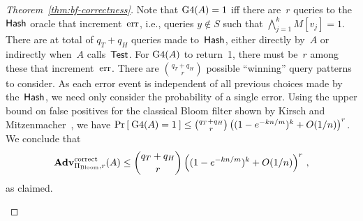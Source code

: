 \begin{proof}[Theorem~\ref{thm:bf-correctness}]
Note that $\text{G4}(A)=1$ iff there are~$r$ queries to the
$\mathsf{Hash}$ oracle that increment~$\mathrm{err}$, i.e., queries $y \not\in
S$ such that $\bigwedge_{j=1}^{k} M[v_j]=1$.
There are at total of $q_T + q_H$ queries made to~$\mathsf{Hash}$,
either directly by~$A$ or indirectly when~$A$ calls~$\mathsf{Test}$.
For $\game{4}(A)$ to return~1, there must be~$r$ among these that
increment~$\mathrm{err}$. %
There are $\binom{q_T+q_H}{r}$ possible ``winning'' query patterns
to consider.   As each error event is independent of all previous
choices made by the~$\mathsf{Hash}$, we need only consider the
probability of a single error. Using the upper bound on false
positives for the classical Bloom filter shown by Kirsch and
Mitzenmacher~\cite{kirsch2006less}, we have $\Pr\left[\: \text{G4}(A)=1 \:\right]
\leq \binom{q_T+q_H}{r}\left( (1-e^{-kn/m})^k + O(1/n) \right)^r$.
We conclude that
\[
\mathrm{\mathbf{Adv}}^{\mathrm{correct}}_{\Pi_{\mathrm{Bloom}},r}(A) \leq  {\dbinom{q_T + q_H}{r}} \left( (1-e^{-kn/m})^k + O(1/n) \right)^r\,,
\]
as claimed.
\begin{figure}[tp]
\fpage{.8}{
\hpagessl{.4}{.4}
{
\underline{$\game{4}(A)$} \\ %
$S \getsr A$; $\err \gets 0$;  $\calC \gets \emptyset$\\
$(\pubaux,\privaux) \getsr \Rep^{\HashOracle}(S)$\\
$\bot \getsr A^{\TestOracle,\HashOracle}(\pubaux)$\\
if $\err  < r$ then Return 0\\
Return 1\\

}}
\end{figure}
\end{proof}
